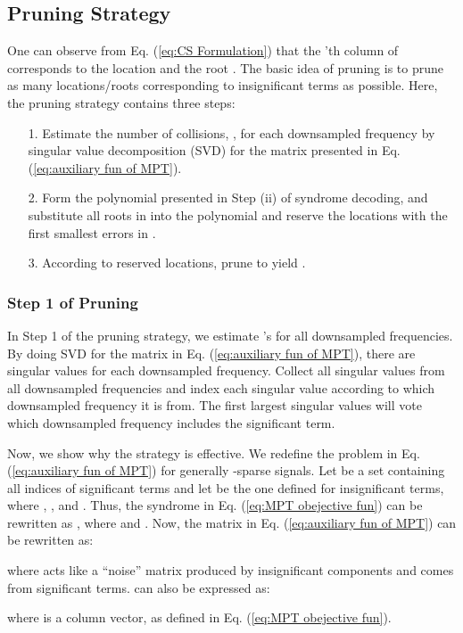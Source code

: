 \documentclass[journal,onecolumn,11pt]{IEEEtran}
\begin{document}
\subsection{Pruning Strategy}\label{Sec: decide a}
One can observe from Eq. (\ref{eq:CS Formulation}) that the 'th column of  corresponds to the location  and the root .
The basic idea of pruning is to prune as many locations/roots corresponding to insignificant terms as possible.
Here, the pruning strategy contains three steps:
\begin{itemize}
  \item[1.] Estimate the number of collisions, , for each downsampled frequency by singular value decomposition (SVD) for the matrix  presented in Eq. (\ref{eq:auxiliary fun of MPT}).
  \item[2.] Form the polynomial presented in Step (ii) of syndrome decoding, and substitute all roots in  into the polynomial and reserve the locations with the first  smallest errors in .
  \item[3.] According to reserved locations, prune  to yield .
\end{itemize}

\subsubsection{Step 1 of Pruning}
In Step 1 of the pruning strategy, we estimate  's for all downsampled frequencies. By doing SVD for the matrix in Eq. (\ref{eq:auxiliary fun of MPT}), there are  singular values for each downsampled frequency. Collect all  singular values from all downsampled frequencies and index each singular value according to which downsampled frequency it is from.
The first  largest singular values will vote which downsampled frequency includes the significant term.

Now, we show why the strategy is effective.
We redefine the problem in Eq. (\ref{eq:auxiliary fun of MPT}) for generally -sparse signals.
Let  be a set containing all indices of significant terms and let  be the one defined for insignificant terms, where , ,  and .
Thus, the syndrome in Eq. (\ref{eq:MPT obejective fun}) can be rewritten as , where
 and .
Now, the matrix  in Eq. (\ref{eq:auxiliary fun of MPT}) can be rewritten as:
\small

\normalsize
where  acts like a ``noise'' matrix produced by insignificant components and  comes from significant terms.
 can also be expressed as:
\small

\normalsize
where   is a column vector, as defined in Eq. (\ref{eq:MPT obejective fun}).
\end{document}
